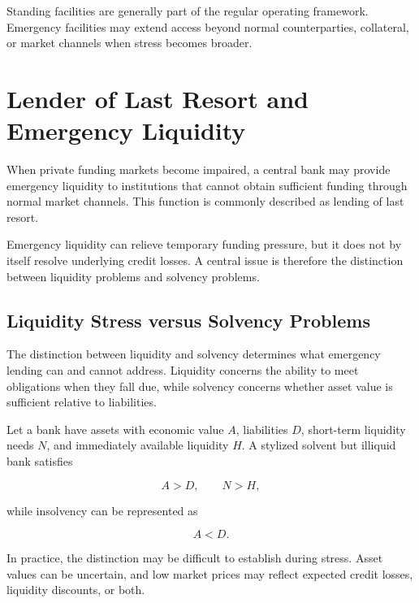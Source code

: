 Standing facilities are generally part of the regular operating framework. Emergency facilities may extend access beyond normal counterparties, collateral, or market channels when stress becomes broader.



\section{Lender of Last Resort and Emergency Liquidity}

When private funding markets become impaired, a central bank may provide emergency liquidity to institutions that cannot obtain sufficient funding through normal market channels. This function is commonly described as lending of last resort.

Emergency liquidity can relieve temporary funding pressure, but it does not by itself resolve underlying credit losses. A central issue is therefore the distinction between liquidity problems and solvency problems.

\subsection{Liquidity Stress versus Solvency Problems}

The distinction between liquidity and solvency determines what emergency lending can and cannot address. Liquidity concerns the ability to meet obligations when they fall due, while solvency concerns whether asset value is sufficient relative to liabilities.

Let a bank have assets with economic value \(A\), liabilities \(D\), short-term liquidity needs \(N\), and immediately available liquidity \(H\). A stylized solvent but illiquid bank satisfies

\begin{equation}
A>D,
\qquad
N>H,
\label{eq:ch22-solvent-illiquid}
\end{equation}

while insolvency can be represented as

\begin{equation}
A<D.
\label{eq:ch22-insolvency}
\end{equation}

In practice, the distinction may be difficult to establish during stress. Asset values can be uncertain, and low market prices may reflect expected credit losses, liquidity discounts, or both.

